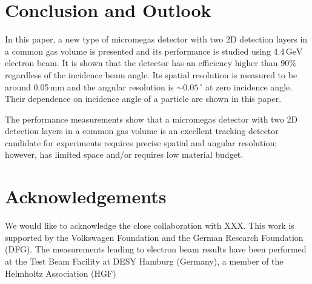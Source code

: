 \documentclass[a4paper,11pt]{article}
\newcommand{\myunit}[1]{$\, \mathrm{#1}$}
\begin{document}
\section{Conclusion and Outlook}
\label{Sec:Conc}

In this paper, a new type of micromegas detector with two 2D detection layers in a common gas volume is presented and its performance is studied using 4.4\myunit{GeV} electron beam. It is shown that the detector has an efficiency higher than $90\%$ regardless of the incidence beam angle. Its spatial resolution is measured to be around 0.05\myunit{mm} and the angular resolution is $\sim 0.05$\myunit{^\circ} at zero incidence angle. Their dependence on incidence angle of a particle are shown in this paper. 

The performance measurements show that a micromegas detector with two 2D detection layers in a common gas volume is an excellent tracking detector candidate for experiments requires precise spatial and angular resolution; however, has limited space and/or requires low material budget. 


\section*{Acknowledgements}

We would like to acknowledge the close collaboration with XXX. This work is supported by the Volkswagen Foundation and the German Research Foundation (DFG). The measurements leading to electron beam results have been performed at the Test Beam Facility at DESY Hamburg (Germany), a member of the Helmholtz Association (HGF)


\end{document}
